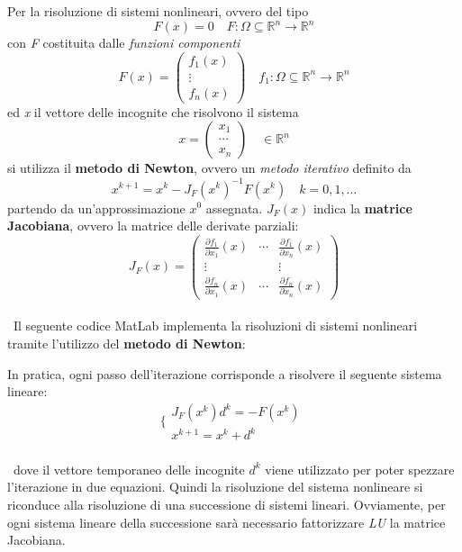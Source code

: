 Per la risoluzione di sistemi nonlineari, ovvero del tipo 
	\[
	F(x)=0 \quad F: \Omega \subseteq \mathbb{R}^n \rightarrow \mathbb{R}^n
	\]
con \textit{F} costituita dalle \textit{funzioni componenti}
	\[
	F(x)=\begin{pmatrix}
		f_1(x) \\
		\vdots \\
		f_n(x)
	\end{pmatrix} \quad
	f_1: \Omega \subseteq \mathbb{R}^n \rightarrow \mathbb{R}^n
	\]
ed \textit{x} il vettore delle incognite che risolvono il sistema 
	\[
	x=\begin{pmatrix}
		x_1 	\\
		\cdots  \\
		x_n
	\end{pmatrix} \quad
	\in \mathbb{R}^n	
	\]
si utilizza il \textbf{metodo di Newton}, ovvero un \textit{metodo iterativo} definito da
	\[
	x^{k+1}=x^k - J_F(x^k)^{-1}F(x^k) \quad k=0,1,...
	\]
partendo da un'approssimazione $x^0$ assegnata. $J_F(x)$ indica la \textbf{matrice Jacobiana}, ovvero la matrice delle derivate parziali:
	\[
	J_F(x)=\begin{pmatrix}
		\frac{\partial f_1}{\partial x_1}(x) & \cdots & \frac{\partial f_1}{\partial x_n}(x) \\
		\vdots & & \vdots \\
		\frac{\partial f_n}{\partial x_1}(x) & \cdots & \frac{\partial f_n}{\partial x_n}(x) 
	\end{pmatrix}
	\]\\\
Il seguente codice MatLab implementa la risoluzioni di sistemi nonlineari tramite l'utilizzo del \textbf{metodo di Newton}:
	
In pratica, ogni passo dell'iterazione corrisponde a risolvere il seguente sistema lineare:
	\[
	\Bigg\{\begin{matrix}
		J_F(x^k)d^k = -F(x^k) \\
		x^{k+1} = x^k + d^k
	\end{matrix}\
	\]\\\
dove il vettore temporaneo delle incognite $d^k$ viene utilizzato per poter spezzare l'iterazione in due equazioni. Quindi la risoluzione del sistema nonlineare si riconduce alla risoluzione di una successione di sistemi lineari. Ovviamente, per ogni sistema lineare della successione sarà necessario fattorizzare \textit{LU} la matrice Jacobiana.